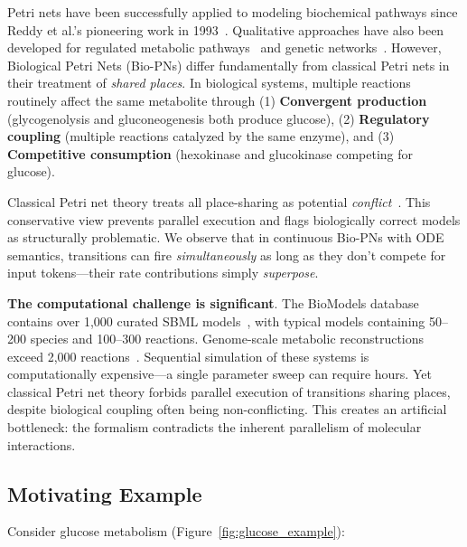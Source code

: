 \documentclass[twocolumn,11pt]{article}
\begin{document}
Petri nets have been successfully applied to modeling biochemical pathways since Reddy et al.'s pioneering work in 1993~\cite{Reddy1993}. Qualitative approaches have also been developed for regulated metabolic pathways~\cite{Simao2005} and genetic networks~\cite{Chaouiya2006}. However, Biological Petri Nets (Bio-PNs) differ fundamentally from classical Petri nets in their treatment of \emph{shared places}. In biological systems, multiple reactions routinely affect the same metabolite through (1) \textbf{Convergent production} (glycogenolysis and gluconeogenesis both produce glucose), (2) \textbf{Regulatory coupling} (multiple reactions catalyzed by the same enzyme), and (3) \textbf{Competitive consumption} (hexokinase and glucokinase competing for glucose).

Classical Petri net theory treats all place-sharing as potential \emph{conflict}~\cite{Reisig2013}. This conservative view prevents parallel execution and flags biologically correct models as structurally problematic. We observe that in continuous Bio-PNs with ODE semantics, transitions can fire \emph{simultaneously} as long as they don't compete for input tokens---their rate contributions simply \emph{superpose}.

\textbf{The computational challenge is significant}. The BioModels database contains over 1,000 curated SBML models~\cite{Malik2020}, with typical models containing 50--200 species and 100--300 reactions. Genome-scale metabolic reconstructions exceed 2,000 reactions~\cite{Orth2011}. Sequential simulation of these systems is computationally expensive---a single parameter sweep can require hours. Yet classical Petri net theory forbids parallel execution of transitions sharing places, despite biological coupling often being non-conflicting. This creates an artificial bottleneck: the formalism contradicts the inherent parallelism of molecular interactions.

\subsection{Motivating Example}

Consider glucose metabolism (Figure~\ref{fig:glucose_example}):
\end{document}
